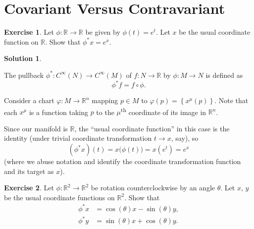 \documentclass[11pt, a4paper]{report}
\theoremstyle{definition}
\newtheorem{ex}{Exercise}[part]
\newtheorem{sol}{Solution}[part]
\newenvironment{nowidthtags}{\usetagform{nowidth}}{\ignorespacesafterend}
\begin{document}
\section{Covariant Versus Contravariant}

\begin{ex}

Let $\phi: \mathbb{R} \to \mathbb{R}$ be given by $\phi(t) = e^t$.
Let $x$ be the usual coordinate function on $\mathbb{R}$.
Show that $\phi^* x = e^x$.

\end{ex}

\begin{sol}\label{sol:pullbackexponential}

The pullback $\phi^*: C^\infty(N) \to C^\infty(M) $ of $f: N \to \mathbb{R}$ by $\phi: M \to N$ is defined as
\begin{nowidthtags}
\[
    \phi^*f = f \circ \phi. \tag{pullback of a function}\label{eq:pullbackfunction}
\]
\end{nowidthtags}

Consider a chart $\varphi: M \to \mathbb{R}^n$ mapping $p \in M$ to $\varphi(p) = \left\{x^\mu(p)\right\}$.
Note that each $x^\mu$ is a function taking $p$ to the $\mu$\textsuperscript{th} coordinate of its image in $\mathbb{R}^n$.

Since our manifold is $\mathbb{R}$, the ``usual coordinate function'' in this case is the identity (under trivial coordinate transformation $t \to x$, say), so
\[
    (\phi^* x)(t) = x \bigl( \phi(t) \bigr) = x(e^t) = e^x
\]
(where we abuse notation and identify the coordinate transformation function and its target as $x$).

\end{sol}

\begin{ex}

Let $\phi: \mathbb{R}^2 \to \mathbb{R}^2$ be rotation counterclockwise by an angle $\theta$. Let $x$, $y$ be the usual coordinate functions on $\mathbb{R}^2$. Show that
\begin{align*}
    \phi^* x &= \cos(\theta) x - \sin(\theta) y, \\
    \phi^* y &= \sin(\theta) x + \cos(\theta) y.
\end{align*}

\end{ex}
\end{document}
